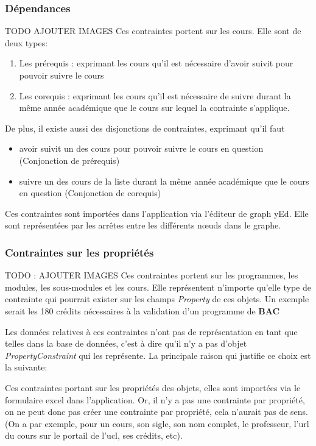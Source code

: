 \subsubsection{Dépendances}
TODO AJOUTER IMAGES
Ces contraintes portent sur les cours. 
Elle sont de deux types:
\begin{enumerate}
\item Les prérequis : exprimant les cours qu'il est nécessaire d'avoir suivit pour pouvoir suivre le cours
\item Les corequis : exprimant les cours qu'il est nécessaire de suivre durant la même année académique que le cours sur lequel la contrainte s'applique. 
\end{enumerate}

De plus, il existe aussi des disjonctions de contraintes, exprimant qu'il faut
\begin{itemize}
\item avoir suivit un des cours pour pouvoir suivre le cours en question (Conjonction de prérequis)
\item suivre un des cours de la liste durant la même année académique que le cours en question (Conjonction de corequis)
\end{itemize}

Ces contraintes sont importées dans l'application via l'éditeur de graph yEd. Elle sont représentées par les arrêtes entre les différents nœuds dans le graphe. 
\subsubsection{Contraintes sur les propriétés}
TODO : AJOUTER IMAGES
Ces contraintes portent sur les programmes, les modules, les sous-modules et les cours. Elle représentent n'importe qu'elle type de contrainte qui pourrait exister sur les champs \textit{Property} de ces objets. Un exemple serait les 180 crédits nécessaires à la validation d'un programme de \textbf{BAC}

Les données relatives à ces contraintes n'ont pas de représentation en tant que telles dans la base de données, c'est à dire qu'il n'y a pas d'objet \textit{PropertyConstraint} qui les représente. La principale raison qui justifie ce choix est la suivante:

Ces contraintes portant sur les propriétés des objets, elles sont importées via le formulaire excel dans l'application. Or, il n'y a pas une contrainte par propriété, on ne peut donc pas créer une contrainte par propriété, cela n'aurait pas de sens. (On a par exemple, pour un cours, son sigle, son nom complet, le professeur, l'url du cours sur le portail de l'ucl, ses crédits, etc). 

